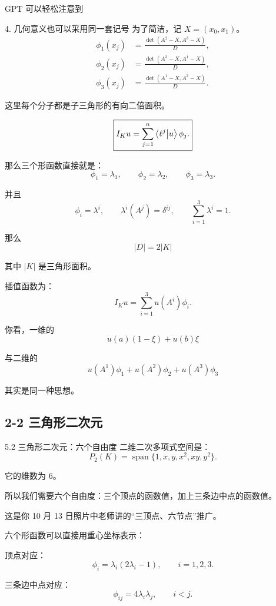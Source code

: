 GPT 可以轻松注意到

4. 几何意义也可以采用同一套记号
为了简洁，记 \(X=(x_0,x_1)\)。
\[
    \boxed{
        \begin{aligned}
            \phi_1(x_j)
             & =\frac{\det(A^2-X,A^3-X)}D, \\
            \phi_2(x_j)
             & =\frac{\det(A^3-X,A^1-X)}D, \\
            \phi_3(x_j)
             & =\frac{\det(A^1-X,A^2-X)}D.
        \end{aligned}
    }
\]

这里每个分子都是子三角形的有向二倍面积。

\[
    \boxed{
        I_Ku=\sum_{j=1}^n\braket{\ell^j}{u}\phi_j.
    }
\]



那么三个形函数直接就是：
\[
    \boxed{
        \phi_1=\lambda_1,\qquad
        \phi_2=\lambda_2,\qquad
        \phi_3=\lambda_3.
    }
\]

并且
\[
    \phi_i=\lambda^i,\qquad
    \lambda^i(A^j)=\delta^{ij},\qquad
    \sum_{i=1}^3\lambda^i=1.
\]

那么
\[
    \boxed{|D|=2|K|}
\]

其中 \(|K|\) 是三角形面积。

插值函数为：
\[
    \boxed{
        I_Ku=\sum_{i=1}^3u(A^i)\phi_i.
    }
\]

你看，一维的
\[
    u(a)(1-\xi)+u(b)\xi
\]

与二维的
\[
    u(A^1)\phi_1+u(A^2)\phi_2+u(A^3)\phi_3
\]

其实是同一种思想。


\subsection{2-2 三角形二次元}
5.2 三角形二次元：六个自由度
二维二次多项式空间是：
\[
    P_2(K)=\operatorname{span}
    \{1,x,y,x^2,xy,y^2\}.
\]

它的维数为 6。

所以我们需要六个自由度：三个顶点的函数值，加上三条边中点的函数值。

这是你 10 月 13 日照片中老师讲的“三顶点、六节点”推广。

六个形函数可以直接用重心坐标表示：

顶点对应：
\[
    \boxed{
        \phi_i=\lambda_i(2\lambda_i-1),
        \qquad i=1,2,3.
    }
\]

三条边中点对应：
\[
    \boxed{
        \phi_{ij}=4\lambda_i\lambda_j,
        \qquad i<j.
    }
\]

